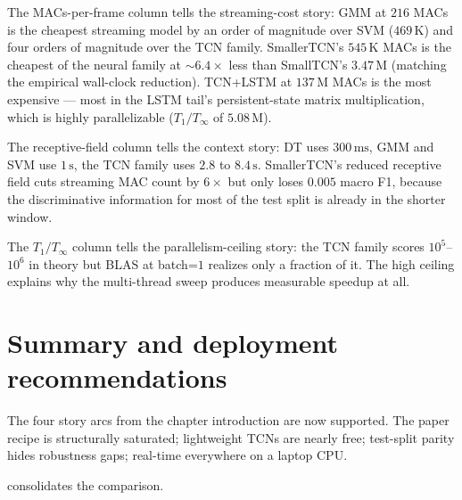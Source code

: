 The MACs-per-frame column tells the streaming-cost story: GMM at $216$ MACs is the cheapest streaming model by an order of magnitude over SVM ($469$\,K) and four orders of magnitude over the TCN family.
SmallerTCN's $545$\,K MACs is the cheapest of the neural family at $\sim 6.4\times$ less than SmallTCN's $3.47$\,M (matching the empirical wall-clock reduction).
TCN+LSTM at $137$\,M MACs is the most expensive — most in the LSTM tail's persistent-state matrix multiplication, which is highly parallelizable ($T_1 / T_\infty$ of $5.08$\,M).

The receptive-field column tells the context story: DT uses $300\,\text{ms}$, GMM and SVM use $1\,\text{s}$, the TCN family uses $2.8$ to $8.4\,\text{s}$.
SmallerTCN's reduced receptive field cuts streaming MAC count by $6\times$ but only loses $0.005$ macro F1, because the discriminative information for most of the test split is already in the shorter window.

The $T_1 / T_\infty$ column tells the parallelism-ceiling story: the TCN family scores $10^5$--$10^6$ in theory but BLAS at batch=$1$ realizes only a fraction of it.
The high ceiling explains why the multi-thread sweep produces measurable speedup at all.

\section{Summary and deployment recommendations}
\label{sec:exp_summary}

The four story arcs from the chapter introduction are now supported.
The paper recipe is structurally saturated; lightweight TCNs are nearly free; test-split parity hides robustness gaps; real-time everywhere on a laptop CPU.

 consolidates the comparison.


